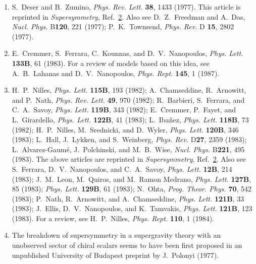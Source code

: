 \begin{enumerate}
  \item {}\label{ch31-ref-13}
  S.~Deser and B.~Zumino, \textit{Phys. Rev. Lett.} \textbf{38}, 1433
  (1977). This article is reprinted in \textit{Supersymmetry},
  Ref.~\hyperref[ch31-ref-2]{2}. Also see D.~Z.~Freedman and A.~Das,
  \textit{Nucl. Phys.} B\textbf{120}, 221 (1977); P.~K.~Townsend,
  \textit{Phys. Rev.} D \textbf{15}, 2802 (1977).

  \item[13a.] \label{ch31-ref-13a}
  E.~Cremmer, S.~Ferrara, C.~Kounnas, and D.~V.~Nanopoulos,
  \textit{Phys. Lett.} \textbf{133B}, 61 (1983). For a review of
  models based on this idea, see A.~B.~Lahanas and D.~V.~Nanopoulos,
  \textit{Phys. Rept.} \textbf{145}, 1 (1987).

  \item {}\label{ch31-ref-14}
  H.~P.~Nilles, \textit{Phys. Lett.} \textbf{115B}, 193 (1982);
  A.~Chamseddine, R.~Arnowitt, and P.~Nath,
  \textit{Phys. Rev. Lett.} \textbf{49}, 970 (1982); R.~Barbieri,
  S.~Ferrara, and C.~A.~Savoy, \textit{Phys. Lett.} \textbf{119B},
  343 (1982); E.~Cremmer, P.~Fayet, and L.~Girardello,
  \textit{Phys. Lett.} \textbf{122B}, 41 (1983); L.~Iba\~nez,
  \textit{Phys. Lett.} \textbf{118B}, 73 (1982); H.~P.~Nilles,
  M.~Srednicki, and D.~Wyler, \textit{Phys. Lett.} \textbf{120B}, 346
  (1983); L.~Hall, J.~Lykken, and S.~Weinberg, \textit{Phys. Rev.}
  D\textbf{27}, 2359 (1983); L.~Alvarez-Gaum\'e, J.~Polchinski, and
  M.~B.~Wise, \textit{Nucl. Phys.} B\textbf{221}, 495 (1983). The
  above articles are reprinted in \textit{Supersymmetry},
  Ref.~\hyperref[ch31-ref-2]{2}. Also see S.~Ferrara,
  D.~V.~Nanopoulos, and C.~A.~Savoy, \textit{Phys. Lett.}
  \textbf{12B}, 214 (1983); J.~M.~Leon, M.~Quiros, and
  M.~Ramon Medrano, \textit{Phys. Lett.} \textbf{127B}, 85 (1983);
  \textit{Phys. Lett.} \textbf{129B}, 61 (1983); N.~Ohta,
  \textit{Prog. Theor. Phys.} \textbf{70}, 542 (1983); P.~Nath,
  R.~Arnowitt, and A.~Chamseddine, \textit{Phys. Lett.} \textbf{121B},
  33 (1983); J.~Ellis, D.~V.~Nanopoulos, and K.~Tamvakis,
  \textit{Phys. Lett.} \textbf{121B}, 123 (1983). For a review, see
  H.~P.~Nilles, \textit{Phys. Rept.} \textbf{110}, 1 (1984).

  \item {}\label{ch31-ref-15}
  The breakdown of supersymmetry in a supergravity theory with an
  unobserved sector of chiral scalars seems to have been first proposed
  in an unpublished University of Budapest preprint by J.~Polonyi
  (1977).


\end{enumerate}
